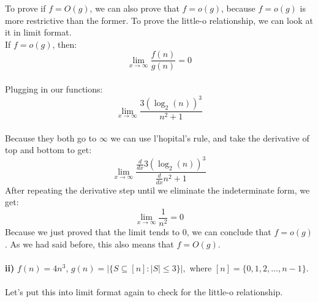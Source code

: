 \documentclass[11pt]{article}
\begin{document}
    To prove if $f = O(g)$, we can also prove that $f = o(g)$, because $f = o(g)$ is more restrictive than the former. To prove the little-o relationship, we can look at it in limit format.
        \\ If $f = o(g)$, then:
    \begin{equation*}
        \lim_{x\to\infty}{\frac{f(n)}{g(n)}} = 0
    \end{equation*}
    \\ Plugging in our functions:
    \begin{equation*}
         \lim_{x\to\infty}{\frac{3(\log_2(n))^3}{n^2+1}}
    \end{equation*}
    \\ Because they both go to $\infty$ we can use l'hopital's rule, and take the derivative of top and bottom to get:
    \begin{equation*}
        \lim_{x\to\infty}\frac{\frac{d}{dx}3(\log_2(n))^3}{\frac{d}{dx}n^2+1}
    \end{equation*}
    After repeating the derivative step until we eliminate the indeterminate form, we get:
    \begin{equation*}
        \lim_{x\to\infty}\frac{1}{n^2} = 0
    \end{equation*}
    Because we just proved that the limit tends to 0, we can conclude that $f = o(g)$. As we had said before, this also means that $f = O(g)$.
    \\\\
    \textbf{ii)} $f(n) = 4n^3$, $g(n)= \left| \{S \subseteq [n] : |S|\leq 3\}\right|,$ where $[n]=\{0,1,2,\ldots,n-1\}$.  
    \\\\ 
    Let's put this into limit format again to check for the little-o relationship. 
    
\end{document}
